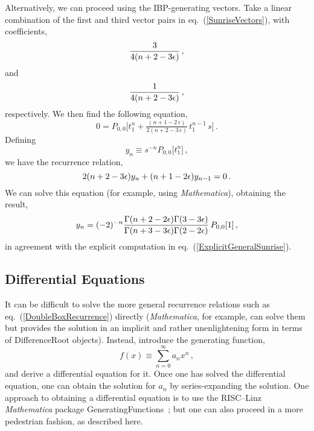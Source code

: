 \documentclass[aps,prd,preprint,groupedaddress,nofootinbib,showpacs,eqsecnum]{revtex4}
\def\eqn#1{eq.~(\ref{#1})}
\def\eps{\epsilon}
\def\Pn#1#2{P_{#1,#2}}
\begin{document}
Alternatively, we can proceed using the IBP-generating vectors.  Take a
linear combination of the first and third vector pairs
in \eqn{SunriseVectors}, with coefficients,
\begin{equation}
\frac{3}{4 (n+2-3\e)}\,,
\end{equation}
and
\begin{equation}
\frac{1}{4 (n+2-3\e)}\,,
\end{equation}
respectively.  We then find the following equation,
\begin{equation}
0 = \Pn00\bigl[
t_{1}^{n}
+\tfrac{(n+1-2\,\eps)}{2(n+2-3\,\eps)}\,t_{1}^{n-1}\,s
\bigr]
\,.
\end{equation}
Defining 
\begin{equation}
y_n \equiv s^{-n} \Pn00\bigl[t_1^n\bigr]\,,
\end{equation}
we have the recurrence relation,
\begin{equation}
2 (n+2-3\e) y_n + (n+1-2\e) y_{n-1} 
= 0\,.
\end{equation}
We can solve this equation (for example, using \textsl{Mathematica\/}),
obtaining the result,
\begin{equation}
y_n = (-2)^{-n} \frac{\Gamma(n+2-2\e)\Gamma(3-3\e)}{\Gamma(n+3-3\e)\Gamma(2-2\e)}\,
\Pn00[1]\,,
\end{equation}
in agreement with the explicit computation in \eqn{ExplicitGeneralSunrise}.

\subsection{Differential Equations}
\label{DiffEqSection}

It can be difficult to solve the more general recurrence relations
such as \eqn{DoubleBoxRecurrence} directly (\textsl{Mathematica\/},
for example, can solve them but provides the solution
in an implicit and rather unenlightening form in terms of
\textsf{DifferenceRoot} objects).
Instead, introduce the generating function,
\begin{equation}
f(x) \equiv \sum_{n=0}^\infty a_n x^n\,,
\end{equation}
and derive a differential equation for it.  Once one has solved the
differential equation, one can obtain the solution for $a_n$ by
series-expanding the solution.  One approach to 
obtaining a differential equation is to use the 
RISC--Linz \textsl{Mathematica\/} package \textsf{GeneratingFunctions}~\cite{GeneratingFunctionsPackage};
but one can also proceed in a more pedestrian fashion, as described
here.
\end{document}
